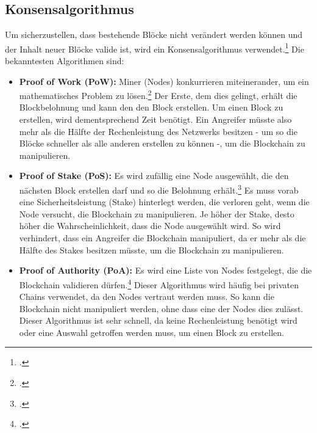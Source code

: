 \subsection{Konsensalgorithmus}
\label{sec:definition-konsensalgorithmus}
Um sicherzustellen, dass bestehende Blöcke nicht verändert werden können und der Inhalt neuer Blöcke valide ist, wird ein Konsensalgorithmus verwendet.\footcite[Vgl.][S. 2 f\adddot]{q4}
Die bekanntesten Algorithmen sind:
\begin{itemize}
    \item \textbf{Proof of Work (PoW):}
    Miner (Nodes) konkurrieren miteinerander, um ein mathematisches Problem zu lösen.\footcite[Vgl. hierzu und zum Folgenden][3]{q4}
    Der Erste, dem dies gelingt, erhält die Blockbelohnung und kann den den Block erstellen.
    Um einen Block zu erstellen, wird dementsprechend Zeit benötigt. 
    Ein Angreifer müsste also mehr als die Hälfte der Rechenleistung des Netzwerks besitzen - um so die Blöcke schneller als alle anderen erstellen zu können -, um die Blockchain zu manipulieren.

    \item \textbf{Proof of Stake (PoS):}
    Es wird zufällig eine Node ausgewählt, die den nächsten Block erstellen darf und so die Belohnung erhält.\footcite[Vgl. hierzu und zum Folgenden][2]{q7}
    Es muss vorab eine Sicherheitsleistung (Stake) hinterlegt werden, die verloren geht, wenn die Node versucht, die Blockchain zu manipulieren. 
    Je höher der Stake, desto höher die Wahrscheinlichkeit, dass die Node ausgewählt wird.
    So wird verhindert, dass ein Angreifer die Blockchain manipuliert, da er mehr als die Hälfte des Stakes besitzen müsste, um die Blockchain zu manipulieren.

    \item \textbf{Proof of Authority (PoA):}
    Es wird eine Liste von Nodes festgelegt, die die Blockchain validieren dürfen.\footcite[Vgl. hierzu und zum Folgenden][]{w14}
    Dieser Algorithmus wird häufig bei privaten Chains verwendet, da den Nodes vertraut werden muss.
    So kann die Blockchain nicht manipuliert werden, ohne dass eine der Nodes dies zulässt.
    Dieser Algorithmus ist sehr schnell, da keine Rechenleistung benötigt wird oder eine Auswahl getroffen werden muss, um einen Block zu erstellen.
    
\end{itemize}
